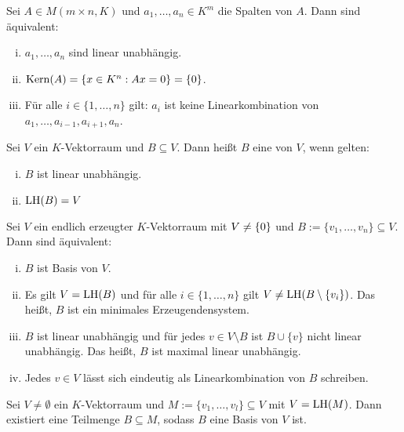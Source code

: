 \setcounter{definition}{8}
\begin{satz}
	\label{satz:I.8.9}
	Sei $A \in M(m\times n, K)$ und $a_1, \dots, a_n \in K^m$ die Spalten von $A$.
	Dann sind äquivalent:
	\begin{enumerate}[(i)]
		\item $a_1,\dots,a_n$ sind linear unabhängig.
		\item $\operatorname{Kern}(A) = \{x \in K^n : Ax = 0\} = \{0\}$.
		\item Für alle $i \in \{1,\dots,n\}$ gilt:
		$a_i$ ist keine Linearkombination von $a_1,\dots,a_{i-1},a_{i+1},a_n$.
	\end{enumerate}
\end{satz}
\newpage
\begin{definition}[Basis]
	\label{def:I.8.10}
	Sei $V$ ein $K$-Vektorraum und $B \subseteq V$.
	Dann heißt $B$ eine  von $V$, wenn gelten:
	\begin{enumerate}[(i)]
		\item $B$ ist linear unabhängig.
		\item $\operatorname{LH}(B) = V$
	\end{enumerate}
\end{definition}

\setcounter{definition}{11}
\begin{satz}
	\label{satz:I.8.12}
	Sei $V$ ein endlich erzeugter $K$-Vektorraum mit $V \neq \{0\}$ und $B := \{v_1,\dots,v_n\} \subseteq V$.
	Dann sind äquivalent:
	\begin{enumerate}[(i)]
		\item $B$ ist Basis von $V$.
		\item Es gilt $V = \operatorname{LH}(B)$ und für alle $i \in \{1,\dots,n\}$ gilt $V \neq \operatorname{LH}(B \setminus \{v_i\})$.
		Das heißt, $B$ ist ein minimales Erzeugendensystem.
		\item $B$ ist linear unabhängig und für jedes $v \in V \setminus B$ ist $B \cup \{v\}$ nicht linear unabhängig.
		Das heißt, $B$ ist maximal linear unabhängig.
		\item Jedes $v \in V$ lässt sich eindeutig als Linearkombination von $B$ schreiben.
	\end{enumerate}
\end{satz}

\begin{satz}[Basisauswahlsatz]
	\label{satz:I.8.13}
	Sei $V \neq \emptyset$ ein $K$-Vektorraum und $M := \{v_1,\dots,v_l\} \subseteq V$ mit $V = \operatorname{LH}(M)$.
	Dann existiert eine Teilmenge $B \subseteq M$, sodass $B$ eine Basis von $V$ ist.
\end{satz}

